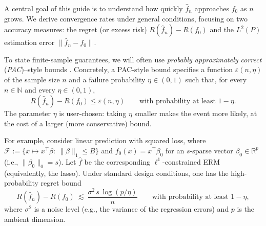 \documentclass[11pt]{article}
\theoremstyle{plain}
\theoremstyle{definition} %
\begin{document}
A central goal of this guide is to understand how quickly \(\hat f_n\) approaches \(f_0\) as \(n\) grows. We derive convergence rates under general conditions, focusing on two accuracy measures: the regret (or excess risk) \(R(\hat f_n)-R(f_0)\) and the \(L^2(P)\) estimation error \(\|\hat f_n-f_0\|\). 


To state finite-sample guarantees, we will often use \textit{probably approximately correct} (\emph{PAC})--style bounds \citep{vapnik1999overview,geer2000empirical,shalev2014understanding,mohri2018foundations,wainwright2019high}. Concretely, a PAC-style bound specifies a function \(\varepsilon(n,\eta)\) of the sample size \(n\) and a failure probability \(\eta\in(0,1)\) such that, for every \(n\in\mathbb{N}\) and every \(\eta\in(0,1)\),
\[
R(\hat f_n)-R(f_0)\le \varepsilon(n,\eta) \qquad\text{with probability at least }1-\eta.
\]
The parameter $\eta$ is user-chosen: taking $\eta$ smaller makes the event more likely, at the cost of a larger (more conservative) bound.

For example, consider linear prediction with squared loss, where $\mathcal F:=\{x\mapsto x^\top\beta:\ \|\beta\|_1\le B\}$ and $f_0(x)=x^\top\beta_0$ for an $s$-sparse vector $\beta_0\in\mathbb R^p$ (i.e., $\|\beta_0\|_0=s$). Let $\hat f$ be the corresponding $\ell^1$-constrained ERM (equivalently, the lasso). Under standard design conditions, one has the high-probability regret bound \citep{wainwright2019high}
\begin{equation}
\label{eqn::highdim}
R(\hat f_n)-R(f_0)
\ \lesssim\
\frac{\sigma^2\, s\,\log(p/\eta)}{n}
\qquad\text{with probability at least }1-\eta,
\end{equation}
where $\sigma^2$ is a noise level (e.g., the variance of the regression errors) and $p$ is the ambient dimension.
\end{document}
